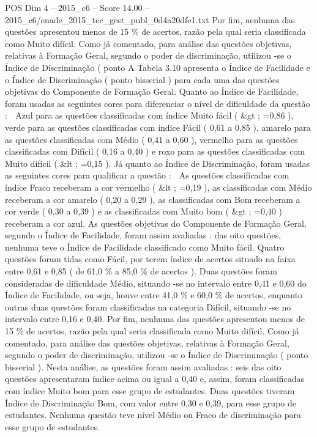 \begin{textsample}{POS Dim 4 – 2015\_c6 – Score 14.00 – 2015\_c6/enade\_2015\_tec\_gest\_publ\_0d4a20dfe1.txt}
Por fim, nenhuma das questões apresentou menos de 15 \% de acertos, razão pela qual seria classificada como Muito difícil.
Como já comentado, para análise das questões objetivas, relativas à Formação Geral, segundo o poder de discriminação, utilizou -se o Índice de Discriminação ( ponto A Tabela 3.10 apresenta o Índice de Facilidade e o Índice de Discriminação ( ponto bisserial ) para cada uma das questões objetivas do Componente de Formação Geral.
Quanto ao Índice de Facilidade, foram usadas as seguintes cores para diferenciar o nível de dificuldade da questão :  Azul para as questões classificadas com índice Muito fácil ( \&gt ; =0,86 ), verde para as questões classificadas com índice Fácil ( 0,61 a 0,85 ), amarelo para as questões classificadas com Médio ( 0,41 a 0,60 ), vermelho para as questões classificadas com Difícil ( 0,16 a 0,40 ) e roxo para as questões classificadas com Muito difícil ( \&lt ; =0,15 ).
Já quanto ao Índice de Discriminação, foram usadas as seguintes cores para qualificar a questão :  As questões classificadas com índice Fraco receberam a cor vermelho ( \&lt ; =0,19 ), as classificadas com Médio receberam a cor amarelo ( 0,20 a 0,29 ), as classificadas com Bom receberam a cor verde ( 0,30 a 0,39 ) e as classificadas com Muito bom ( \&gt ; =0,40 ) receberam a cor azul.
As questões objetivas do Componente de Formação Geral, segundo o Índice de Facilidade, foram assim avaliadas : das oito questões, nenhuma teve o Índice de Facilidade classificado como Muito fácil.
Quatro questões foram tidas como Fácil, por terem índice de acertos situado na faixa entre 0,61 e 0,85 ( de 61,0 \% a 85,0 \% de acertos ).
Duas questões foram consideradas de dificuldade Médio, situando -se no intervalo entre 0,41 e 0,60 do Índice de Facilidade, ou seja, houve entre 41,0 \% e 60,0 \% de acertos, enquanto outras duas questões foram classificadas na categoria Difícil, situando -se no intervalo entre 0,16 e 0,40.
Por fim, nenhuma das questões apresentou menos de 15 \% de acertos, razão pela qual seria classificada como Muito difícil.
Como já comentado, para análise das questões objetivas, relativas à Formação Geral, segundo o poder de discriminação, utilizou -se o Índice de Discriminação ( ponto bisserial ).
Nesta análise, as questões foram assim avaliadas : seis das oito questões apresentaram índice acima ou igual a 0,40 e, assim, foram classificadas com índice Muito bom para esse grupo de estudantes.
Duas questões tiveram Índice de Discriminação Bom, com valor entre 0,30 e 0,39, para esse grupo de estudantes.
Nenhuma questão teve nível Médio ou Fraco de discriminação para esse grupo de estudantes.

\end{textsample}
